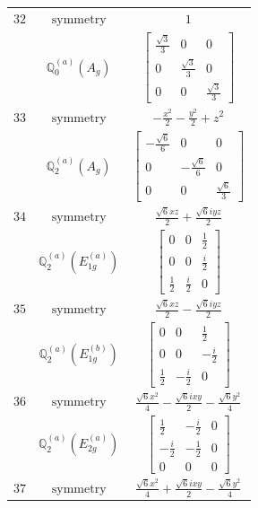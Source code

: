 \documentclass[fleqn,8pt,landscape]{jsarticle}
\begin{document}
\begin{longtable}{ccc}
$ 32 $ & $ \text{symmetry} $ & $ 1 $ \\
$  $ & $ \mathbb{Q}_{0}^{(a)}(A_{g}) $ & $ \begin{bmatrix} \frac{\sqrt{3}}{3} & 0 & 0 \\ 0 & \frac{\sqrt{3}}{3} & 0 \\ 0 & 0 & \frac{\sqrt{3}}{3} \end{bmatrix} $ \\ \hline
$ 33 $ & $ \text{symmetry} $ & $ - \frac{x^{2}}{2} - \frac{y^{2}}{2} + z^{2} $ \\
$  $ & $ \mathbb{Q}_{2}^{(a)}(A_{g}) $ & $ \begin{bmatrix} - \frac{\sqrt{6}}{6} & 0 & 0 \\ 0 & - \frac{\sqrt{6}}{6} & 0 \\ 0 & 0 & \frac{\sqrt{6}}{3} \end{bmatrix} $ \\ \hline
$ 34 $ & $ \text{symmetry} $ & $ \frac{\sqrt{6} x z}{2} + \frac{\sqrt{6} i y z}{2} $ \\
$  $ & $ \mathbb{Q}_{2}^{(a)}(E_{1g}^{(a)}) $ & $ \begin{bmatrix} 0 & 0 & \frac{1}{2} \\ 0 & 0 & \frac{i}{2} \\ \frac{1}{2} & \frac{i}{2} & 0 \end{bmatrix} $ \\ \hline
$ 35 $ & $ \text{symmetry} $ & $ \frac{\sqrt{6} x z}{2} - \frac{\sqrt{6} i y z}{2} $ \\
$  $ & $ \mathbb{Q}_{2}^{(a)}(E_{1g}^{(b)}) $ & $ \begin{bmatrix} 0 & 0 & \frac{1}{2} \\ 0 & 0 & - \frac{i}{2} \\ \frac{1}{2} & - \frac{i}{2} & 0 \end{bmatrix} $ \\ \hline
$ 36 $ & $ \text{symmetry} $ & $ \frac{\sqrt{6} x^{2}}{4} - \frac{\sqrt{6} i x y}{2} - \frac{\sqrt{6} y^{2}}{4} $ \\
$  $ & $ \mathbb{Q}_{2}^{(a)}(E_{2g}^{(a)}) $ & $ \begin{bmatrix} \frac{1}{2} & - \frac{i}{2} & 0 \\ - \frac{i}{2} & - \frac{1}{2} & 0 \\ 0 & 0 & 0 \end{bmatrix} $ \\ \hline
$ 37 $ & $ \text{symmetry} $ & $ \frac{\sqrt{6} x^{2}}{4} + \frac{\sqrt{6} i x y}{2} - \frac{\sqrt{6} y^{2}}{4} $ \\

\end{longtable}
\end{document}
